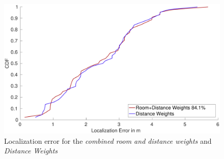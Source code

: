 \begin{figure}
\centering
\includegraphics[width=\textwidth]{Figures/WeightingCDF_realDistance}
\decoRule
\caption[CDF Room+Distance Weights - comparison against Distance Weights]{Localization error for the \emph{combined room and distance weights} and \emph{Distance Weights}}
\label{fig:WeightingCDFrealDistance}
\end{figure}